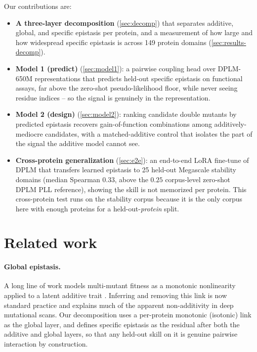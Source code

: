 \documentclass{article}
\begin{document}
Our contributions are:
\begin{itemize}
  \item \textbf{A three-layer decomposition} (\cref{sec:decomp}) that separates
  additive, global, and specific epistasis per protein, and a measurement of how
  large and how widespread specific epistasis is across 149 protein domains
  (\cref{sec:results-decomp}).
  \item \textbf{Model 1 (predict)} (\cref{sec:model1}): a pairwise coupling head
  over DPLM-650M representations that predicts held-out specific epistasis on
  functional assays, far above the zero-shot pseudo-likelihood floor, while never
  seeing residue indices -- so the signal is genuinely in the representation.
  \item \textbf{Model 2 (design)} (\cref{sec:model2}): ranking candidate double
  mutants by predicted epistasis recovers gain-of-function combinations among
  additively-mediocre candidates, with a matched-additive control that isolates
  the part of the signal the additive model cannot see.
  \item \textbf{Cross-protein generalization} (\cref{sec:e2e}): an end-to-end
  LoRA fine-tune of DPLM that transfers learned epistasis to 25 held-out
  Megascale stability domains (median Spearman $0.33$, above the $0.25$ corpus-level
  zero-shot DPLM PLL reference), showing the skill is not memorized per protein. This cross-protein
  test runs on the stability corpus because it is the only corpus here with
  enough proteins for a held-out-\emph{protein} split.
\end{itemize}

\section{Related work}
\label{sec:related}

\paragraph{Global epistasis.}
A long line of work models multi-mutant fitness as a monotonic nonlinearity
applied to a latent additive trait
\citep{otwinowski2018inferring,sailer2017detecting}. Inferring and removing this
link is now standard practice and explains much of the apparent non-additivity in
deep mutational scans. Our decomposition uses a per-protein monotonic (isotonic)
link as the global layer, and defines specific epistasis as the residual after
both the additive and global layers, so that any held-out skill on it is genuine
pairwise interaction by construction.
\end{document}
